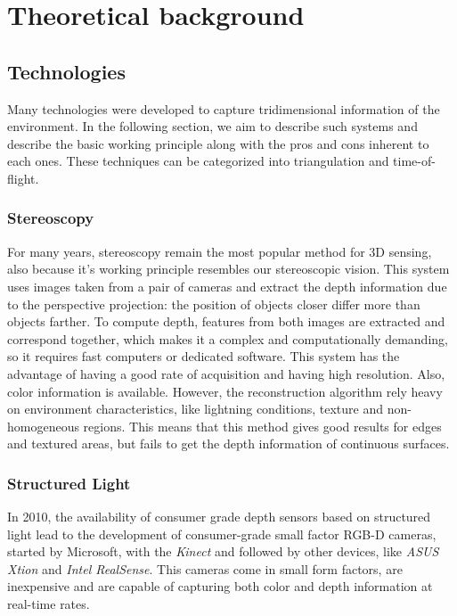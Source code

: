 \chapter{Theoretical background}

\section{Technologies}

Many technologies were developed to capture tridimensional information of the environment. In the following section, we aim to describe such systems and describe the basic working principle along with the pros and cons inherent to each ones. These techniques can be categorized into triangulation and time-of-flight.

\subsection{Stereoscopy}

For many years, stereoscopy remain the most popular method for 3D sensing, also because it's working principle resembles our stereoscopic vision. This system uses images taken from a pair of cameras and extract the depth information due to the perspective projection: the position of objects closer differ more than objects farther. To compute depth, features from both images are extracted and correspond together, which makes it a complex and computationally demanding, so it requires fast computers or dedicated software. This system has the advantage of having a good rate of acquisition and having high resolution. Also, color information is available. However, the reconstruction algorithm rely heavy on environment characteristics, like lightning conditions, texture and non-homogeneous regions\cite{klimentjew2010}. This means that this method gives good results for edges and textured areas, but fails to get the depth information of continuous surfaces.

\subsection{Structured Light}

In 2010, the availability of consumer grade depth sensors based on structured light lead to the development of consumer-grade small factor RGB-D cameras, started by Microsoft, with the \textit{Kinect} and followed by other devices, like \textit{ASUS Xtion} and \textit{Intel RealSense}. This cameras come in small form factors, are inexpensive and are capable of capturing both color and depth information at real-time rates\cite{zollhoefer2018}.

